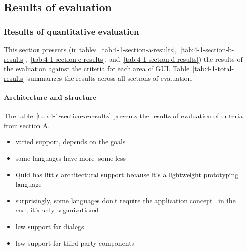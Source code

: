 \subsection{Results of evaluation}\label{subsec:results-of-evaluation}

\subsubsection{Results of quantitative evaluation}

This section presents (in tables~\ref{tab:4-1-section-a-results},~\ref{tab:4-1-section-b-results},~\ref{tab:4-1-section-c-results}, and~\ref{tab:4-1-section-d-results}) the results of the evaluation against the criteria for each area of GUI\@.
Table~\ref{tab:4-1-total-results} summarizes the results across all sections of evaluation.

\paragraph{Architecture and structure}

The table~\ref{tab:4-1-section-a-results} presents the results of evaluation of criteria from section A\@.
\begin{itemize}
    \item varied support, depends on the goals
    \item some languages have more, some less
    \item Quid has little architectural support because it's a lightweight prototyping language
    \item surprisingly, some languages don't require the application concept \textendash\ in the end, it's only organizational
    \item low support for dialogs
    \item low support for third party components
\end{itemize}

